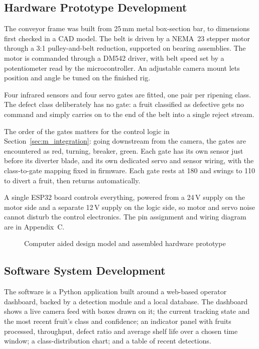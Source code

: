 \subsection{Hardware Prototype Development}
\label{sec:m_prototype}

The conveyor frame was built from 25\,mm metal box-section bar, to dimensions first checked in a \acrfull{CAD} model. The belt is driven by a NEMA~23 stepper motor through a 3:1 pulley-and-belt reduction, supported on bearing assemblies. The motor is commanded through a DM542 driver, with belt speed set by a potentiometer read by the microcontroller. An adjustable camera mount lets position and angle be tuned on the finished rig.

Four infrared sensors and four servo gates are fitted, one pair per ripening class. The defect class deliberately has no gate: a fruit classified as defective gets no command and simply carries on to the end of the belt into a single reject stream.

The order of the gates matters for the control logic in Section~\ref{sec:m_integration}: going downstream from the camera, the gates are encountered as red, turning, breaker, green. Each gate has its own sensor just before its diverter blade, and its own dedicated servo and sensor wiring, with the class-to-gate mapping fixed in firmware. Each gate rests at 180\textdegree{} and swings to 110\textdegree{} to divert a fruit, then returns automatically.

A single ESP32 board controls everything, powered from a 24\,V supply on the motor side and a separate 12\,V supply on the logic side, so motor and servo noise cannot disturb the control electronics. The pin assignment and wiring diagram are in Appendix~C.

\begin{figure}[H]
\centering
{}
\caption{Computer aided design model and assembled hardware prototype}
\label{fig:prototype}
\end{figure}

\subsection{Software System Development}
\label{sec:m_softwaredev}

The software is a Python application built around a web-based operator dashboard, backed by a detection module and a local database. The dashboard shows a live camera feed with boxes drawn on it; the current tracking state and the most recent fruit's class and confidence; an indicator panel with fruits processed, throughput, defect ratio and average shelf life over a chosen time window; a class-distribution chart; and a table of recent detections.

